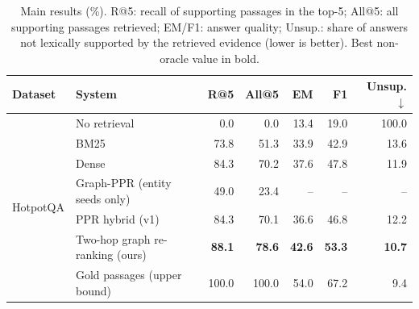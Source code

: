 \begin{table}[t]
\centering
\small
\caption{Main results (\%). R@5: recall of supporting passages in the top-5; All@5: all supporting passages retrieved; EM/F1: answer quality; Unsup.: share of answers not lexically supported by the retrieved evidence (lower is better). Best non-oracle value in bold.}
\label{tab:main}
\begin{tabular}{llrrrrr}
\toprule
Dataset & System & R@5 & All@5 & EM & F1 & Unsup.$\downarrow$ \\
\midrule
\multirow{7}{*}{HotpotQA} & No retrieval & 0.0 & 0.0 & 13.4 & 19.0 & 100.0 \\
 & BM25 & 73.8 & 51.3 & 33.9 & 42.9 & 13.6 \\
 & Dense & 84.3 & 70.2 & 37.6 & 47.8 & 11.9 \\
 & Graph-PPR (entity seeds only) & 49.0 & 23.4 & -- & -- & -- \\
 & PPR hybrid (v1) & 84.3 & 70.1 & 36.6 & 46.8 & 12.2 \\
 & Two-hop graph re-ranking (ours) & \textbf{88.1} & \textbf{78.6} & \textbf{42.6} & \textbf{53.3} & \textbf{10.7} \\
 & Gold passages (upper bound) & 100.0 & 100.0 & 54.0 & 67.2 & 9.4 \\
\bottomrule
\end{tabular}
\end{table}